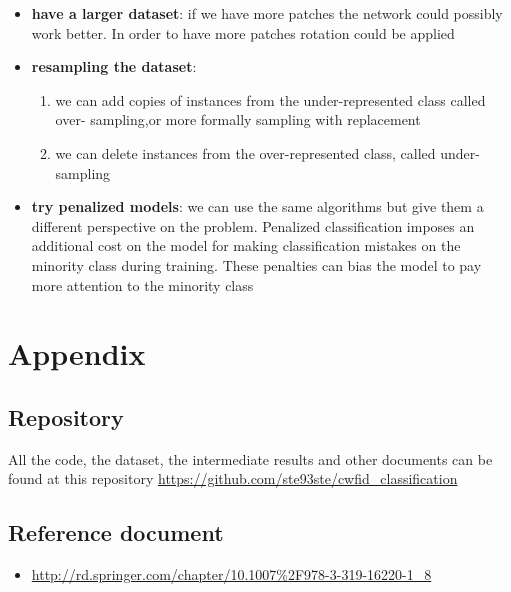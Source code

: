 \documentclass[]{report}
\begin{document}
\begin{itemize}

	\item \textbf{have a larger dataset}: if we have more patches the network could possibly work 			          better. In order to have more patches rotation could be applied
	
	\item \textbf{resampling the dataset}: 
   \begin{enumerate}
   
		\item we can add copies of instances from the under-represented class called over-		              sampling,or more formally sampling with replacement
		\item we can delete instances from the over-represented class, called under-sampling
   
   \end{enumerate}
   
   \item \textbf{try penalized models}: we can use the same algorithms but give them a different perspective on the problem.
Penalized classification imposes an additional cost on the model for making classification mistakes on the minority class during training. These penalties can bias the model to pay more attention to the minority class 

\end{itemize}

\chapter{Appendix}

\section{Repository}

All the code, the dataset, the intermediate results and other documents can be found at this repository \url{https://github.com/ste93ste/cwfid_classification}

\section{Reference document}
 \begin{itemize}
 
 	\item\url{http://rd.springer.com/chapter/10.1007%2F978-3-319-16220-1_8}
	
 \end{itemize}
\end{document}
